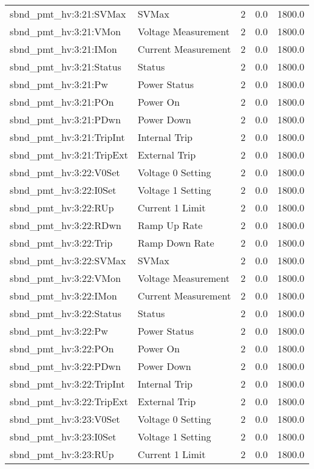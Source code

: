 \begin{center}
\begin{longtable}{l | l l l l }
sbnd\_pmt\_hv:3:21:SVMax & SVMax & 2 & 0.0 & 1800.0\\ 
sbnd\_pmt\_hv:3:21:VMon & Voltage Measurement & 2 & 0.0 & 1800.0\\ 
sbnd\_pmt\_hv:3:21:IMon & Current Measurement & 2 & 0.0 & 1800.0\\ 
sbnd\_pmt\_hv:3:21:Status & Status & 2 & 0.0 & 1800.0\\ 
sbnd\_pmt\_hv:3:21:Pw & Power Status & 2 & 0.0 & 1800.0\\ 
sbnd\_pmt\_hv:3:21:POn & Power On & 2 & 0.0 & 1800.0\\ 
sbnd\_pmt\_hv:3:21:PDwn & Power Down & 2 & 0.0 & 1800.0\\ 
sbnd\_pmt\_hv:3:21:TripInt & Internal Trip & 2 & 0.0 & 1800.0\\ 
sbnd\_pmt\_hv:3:21:TripExt & External Trip & 2 & 0.0 & 1800.0\\ 
sbnd\_pmt\_hv:3:22:V0Set & Voltage 0 Setting & 2 & 0.0 & 1800.0\\ 
sbnd\_pmt\_hv:3:22:I0Set & Voltage 1 Setting & 2 & 0.0 & 1800.0\\ 
sbnd\_pmt\_hv:3:22:RUp & Current 1 Limit & 2 & 0.0 & 1800.0\\ 
sbnd\_pmt\_hv:3:22:RDwn & Ramp Up Rate & 2 & 0.0 & 1800.0\\ 
sbnd\_pmt\_hv:3:22:Trip & Ramp Down Rate & 2 & 0.0 & 1800.0\\ 
sbnd\_pmt\_hv:3:22:SVMax & SVMax & 2 & 0.0 & 1800.0\\ 
sbnd\_pmt\_hv:3:22:VMon & Voltage Measurement & 2 & 0.0 & 1800.0\\ 
sbnd\_pmt\_hv:3:22:IMon & Current Measurement & 2 & 0.0 & 1800.0\\ 
sbnd\_pmt\_hv:3:22:Status & Status & 2 & 0.0 & 1800.0\\ 
sbnd\_pmt\_hv:3:22:Pw & Power Status & 2 & 0.0 & 1800.0\\ 
sbnd\_pmt\_hv:3:22:POn & Power On & 2 & 0.0 & 1800.0\\ 
sbnd\_pmt\_hv:3:22:PDwn & Power Down & 2 & 0.0 & 1800.0\\ 
sbnd\_pmt\_hv:3:22:TripInt & Internal Trip & 2 & 0.0 & 1800.0\\ 
sbnd\_pmt\_hv:3:22:TripExt & External Trip & 2 & 0.0 & 1800.0\\ 
sbnd\_pmt\_hv:3:23:V0Set & Voltage 0 Setting & 2 & 0.0 & 1800.0\\ 
sbnd\_pmt\_hv:3:23:I0Set & Voltage 1 Setting & 2 & 0.0 & 1800.0\\ 
sbnd\_pmt\_hv:3:23:RUp & Current 1 Limit & 2 & 0.0 & 1800.0\\ 

\end{longtable}
\end{center}
